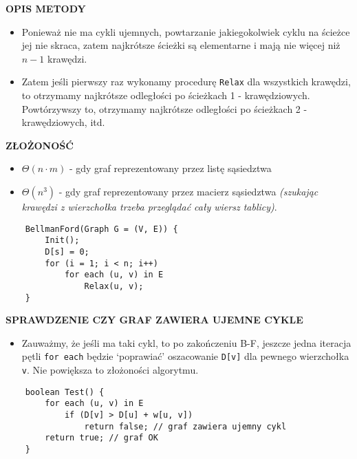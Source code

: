 \documentclass[algorytmy.tex]{subfiles}
\begin{document}
    \textbf{OPIS METODY}
    \begin{itemize}
        \item Ponieważ nie ma cykli ujemnych, powtarzanie jakiegokolwiek cyklu
            na ścieżce jej nie skraca, zatem najkrótsze ścieżki są elementarne
            i mają nie więcej niż $n-1$ krawędzi.
        \item Zatem jeśli pierwszy raz wykonamy procedurę \texttt{Relax} dla
            wszystkich krawędzi, to otrzymamy najkrótsze odległości po ścieżkach
            1 - krawędziowych. Powtórzywszy to, otrzymamy najkrótsze odległości po
            ścieżkach 2 - krawędziowych, itd.
    \end{itemize}

    \textbf{ZŁOŻONOŚĆ}
    \begin{itemize}
        \item $\Theta(n \cdot m )$ - gdy graf reprezentowany przez listę
            sąsiedztwa
        \item $\Theta(n^3)$ - gdy graf reprezentowany przez macierz sąsiedztwa
            \textit{(szukając krawędzi z wierzchołka trzeba przeglądać cały
            wiersz tablicy)}.
    \end{itemize}

    \begin{verbatim}
    BellmanFord(Graph G = (V, E)) {
        Init();
        D[s] = 0;
        for (i = 1; i < n; i++)
            for each (u, v) in E
                Relax(u, v);
    }
    \end{verbatim}

    \textbf{SPRAWDZENIE CZY GRAF ZAWIERA UJEMNE CYKLE}
    \begin{itemize}
        \item Zauważmy, że jeśli ma taki cykl, to po zakończeniu B-F, jeszcze
            jedna iteracja pętli \texttt{for each} będzie ‘poprawiać’
            oszacowanie \texttt{D[v]} dla pewnego wierzchołka \texttt{v}.
            Nie powiększa to złożoności algorytmu.
    \end{itemize}

    \begin{verbatim}
    boolean Test() {
        for each (u, v) in E
            if (D[v] > D[u] + w[u, v])
                return false; // graf zawiera ujemny cykl
        return true; // graf OK
    }
    \end{verbatim}
\end{document}
